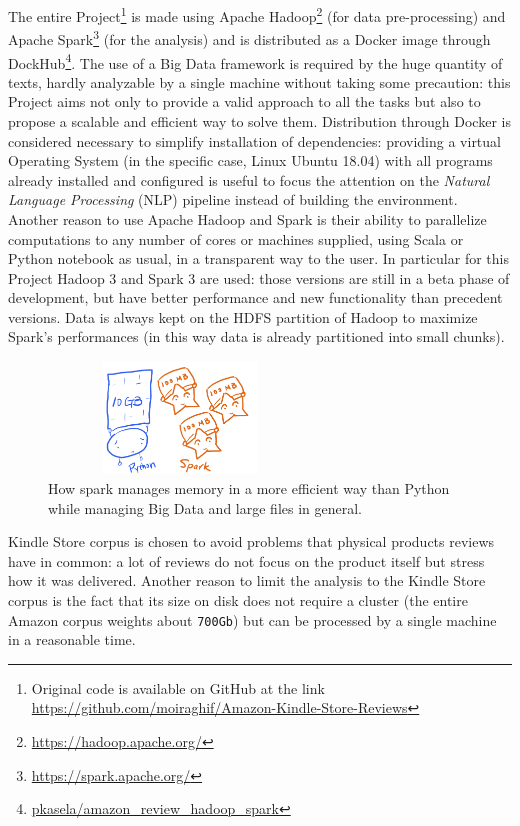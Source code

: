 \documentclass[fleqn,10pt]{SelfArx}
\begin{document}
The entire Project\footnote{Original code is available on GitHub at the link \url{https://github.com/moiraghif/Amazon-Kindle-Store-Reviews}} is made using Apache Hadoop\footnote{\url{https://hadoop.apache.org/}} (for data pre-processing) and Apache Spark\footnote{\url{https://spark.apache.org/}} (for the analysis) and is distributed as a Docker image through DockHub\footnote{\url{pkasela/amazon_review_hadoop_spark}}.
The use of a Big Data framework is required by the huge quantity of texts, hardly analyzable by a single machine without taking some precaution: this Project aims not only to provide a valid approach to all the tasks but also to propose a scalable and efficient way to solve them.
Distribution through Docker is considered necessary to simplify installation of dependencies: providing a virtual Operating System (in the specific case, Linux Ubuntu 18.04) with all programs already installed and configured is useful to focus the attention on the \textit{Natural Language Processing} (NLP) pipeline instead of building the environment.\newline
Another reason to use Apache Hadoop and Spark is their ability to parallelize computations to any number of cores or machines supplied, using Scala or Python notebook as usual, in a transparent way to the user.
In particular for this Project Hadoop 3 and Spark 3 are used: those versions are still in a beta phase of development, but have better performance and new functionality than precedent versions.
Data is always kept on the HDFS partition of Hadoop to maximize Spark's performances (in this way data is already partitioned into small chunks).
\begin{figure}[!h]
    \centering
    \includegraphics[width=7cm, height=3cm]{pyspark-work.png}
    \caption{How spark manages memory in a more efficient way than Python while managing Big Data and large files in general.}
\end{figure}

Kindle Store corpus is chosen to avoid problems that physical products reviews have in common: a lot of reviews do not focus on the product itself but stress how it was delivered.
Another reason to limit the analysis to the Kindle Store corpus is the fact that its size on disk does not require a cluster (the entire Amazon corpus weights about \verb|700Gb|) but can be processed by a single machine in a reasonable time.
\end{document}
